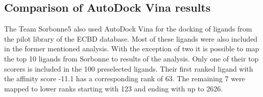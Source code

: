 \documentclass[11pt, letterpaper, titlepage]{article}
\begin{document}
\subsection{Comparison of AutoDock Vina results}
The Team Sorbonne5 also used AutoDock Vina for the docking of ligands from the pilot library of the ECBD database. Most of these ligands were also included in the former mentioned analysis. With the exception of two it is possible to map the top 10 ligands from Sorbonne to results of the analysis. Only one of their top scorers is included in the 100 preselected ligands. Their first ranked ligand with the affinity score -11.1 has a corresponding rank of 63. The remaining 7 were mapped to lower ranks starting with 123 and ending with up to 2626.
\end{document}
